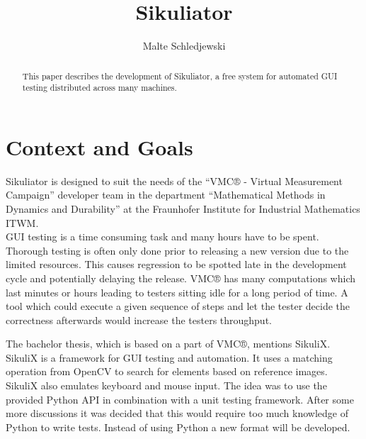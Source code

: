 \documentclass[a4paper,twocolumn]{article}
\title{Sikuliator}
\author{Malte Schledjewski}
\newcommand{\VMC}[0]{VMC®}
\newcommand{\Sik}[0]{Sikuliator}
\begin{document}


\maketitle
\begin{abstract}
	
	
	This paper describes the development of \Sik, 
	a free system for automated GUI testing distributed across many machines.
	
\end{abstract}
\listoftodos

\section{Context and Goals}
\Sik{} is designed to suit the needs of the \enquote{\VMC{} - Virtual Measurement Campaign} developer team in the
department \enquote{Mathematical Methods in Dynamics and Durability} 
at the Fraunhofer Institute for Industrial Mathematics ITWM.\\
GUI testing is a time consuming task and many hours have to be spent.
Thorough testing is often only done prior to releasing a new version due to the limited resources.
This causes regression to be spotted late in the development cycle and potentially delaying the release.
\VMC{} has many computations which last minutes or hours leading to testers sitting idle for a long period of time.
A tool which could execute a given sequence of steps and let the tester decide the correctness afterwards would increase the testers throughput.

The bachelor thesis\cite{BachelorMapViewer}, which is based on a part of \VMC{}, mentions SikuliX\cite{SikuliX}.
SikuliX is a framework for GUI testing and automation.
It uses a matching operation from OpenCV\cite{OpenCV} to search for elements based on reference images.
SikuliX also emulates keyboard and mouse input.
The idea was to use the provided Python API in combination with a unit testing framework.
After some more discussions it was decided that this would require too much knowledge of Python to write tests.
Instead of using Python a new format will be developed.
\end{document}
